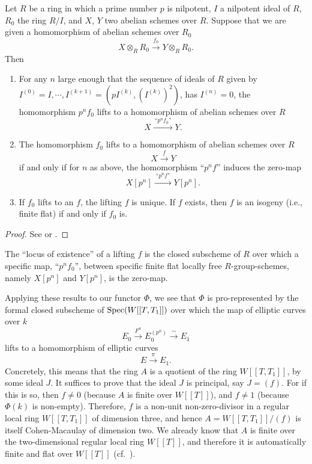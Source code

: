 \begin{kthm}[Drinfeld]\label{thm:6.8.4}
Let $R$ be a ring in which a prime number $p$ is nilpotent, $I$ a nilpotent ideal of $R$, $R_0$ the ring $R/I$, and $X$, $Y$ two abelian schemes over $R$. Suppose that we are given a homomorphism of abelian schemes over $R_0$
\[
X \otimes_R R_0 \xrightarrow{\ f_0\ } Y \otimes_R R_0 .
\]
Then
\begin{enumerate}[(1)]
\item For any $n$ large enough that the sequence of ideals of $R$ given by $I^{(0)} = I, \cdots, I^{(k+1)} = (pI^{(k)}, (I^{(k)})^2)$, has $I^{(n)} = 0$, the homomorphism $p^nf_0$ lifts to a homomorphism of abelian schemes over $R$
\[
X \xrightarrow{\ \text{``}p^nf_0\text{''}\ } Y .
\]
\item The homomorphism $f_0$ lifts to a homomorphism of abelian schemes over $R$
\[
X \xrightarrow{\ f\ } Y
\]
if and only if for $n$ as above, the homomorphism ``$p^nf$'' induces the zero-map
\[
X[p^n] \xrightarrow{\ \text{``}p^nf\text{''}\ } Y[p^n] .
\]
\item If $f_0$ lifts to an $f$, the lifting $f$ is unique. If $f$ exists, then $f$ is an isogeny (i.e., finite flat) if and only if $f_0$ is.
\end{enumerate}
\end{kthm}

\begin{proof}
See \cite{Dr2} or \cite{K5}.
\end{proof}

\begin{kcor}\label{cor:6.8.5}
The ``locus of existence'' of a lifting $f$ is the closed subscheme of $R$ over which a specific map, ``$p^nf_0$'', between specific finite flat locally free $R$-group-schemes, namely $X[p^n]$ and $Y[p^n]$, is the zero-map.
\end{kcor}

Applying these results to our functor $\Phi$, we see that $\Phi$ is pro-represented by the formal closed subscheme of $\operatorname{Spec}(W[[T,T_1]])$ over which the map of elliptic curves over $k$
\[
E_0 \xrightarrow{F^n} E_0^{(p^n)} \xrightarrow{\ \sim\ } E_1
\]
lifts to a homomorphism of elliptic curves
\[
E \xrightarrow{\ \pi\ } E_1 .
\]
Concretely, this means that the ring $A$ is a quotient of the ring $W[[T,T_1]]$, by some ideal $J$. It suffices to prove that the ideal $J$ is principal, say $J = (f)$. For if this is so, then $f \ne 0$ (because $A$ is finite over $W[[T]]$), and $f \ne 1$ (because $\Phi(k)$ is non-empty). Therefore, $f$ is a non-unit non-zero-divisor in a regular local ring $W[[T,T_1]]$ of dimension three, and hence $A = W[[T,T_1]]/(f)$ is itself Cohen-Macaulay of dimension two. We already know that $A$ is finite over the two-dimensional regular local ring $W[[T]]$, and therefore it is automatically finite and flat over $W[[T]]$ (cf.\ \cite[V, 3.5]{AK1}).

